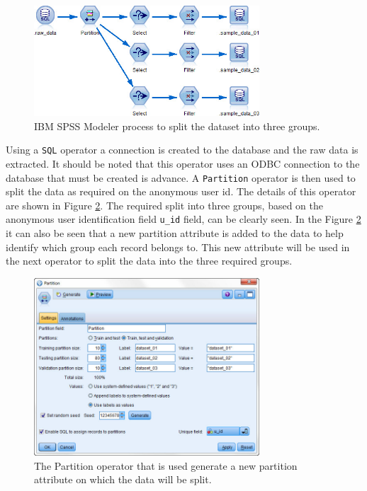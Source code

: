 \begin{figure}[htbp]
	\centering
	\includegraphics[width=0.75\textwidth]{Figures/Chapter4/data_partitioning.jpg}
	\caption[Partitioning data using IBM SPSS]{IBM SPSS Modeler process to split the dataset into three groups.}
	\label{fig:chapter4:data_partitioning}
\end{figure}

Using a \verb|SQL| operator a connection is created to the database and the raw data is extracted. It should be noted that this operator uses an ODBC connection to the database that must be created is advance. A \verb|Partition| operator is then used to split the data as required on the anonymous user id. The details of this operator are shown in Figure \ref{fig:chapter4:partition_operator}. The required split into three groups, based on the anonymous user identification field \verb|u_id| field, can be clearly seen. In the Figure \ref{fig:chapter4:partition_operator} it can also be seen that a new partition attribute is added to the data to help identify which group each record belongs to. This new attribute will be used in the next operator to split the data into the three required groups. 

\begin{figure}[htbp]
	\centering
	\includegraphics[width=0.75\textwidth]{Figures/Chapter4/partition_operator.jpg}
	\caption[Partition operator used generate a new attribute]{The Partition operator that is used generate a new partition attribute on which the data will be split.}
	\label{fig:chapter4:partition_operator}
\end{figure}

